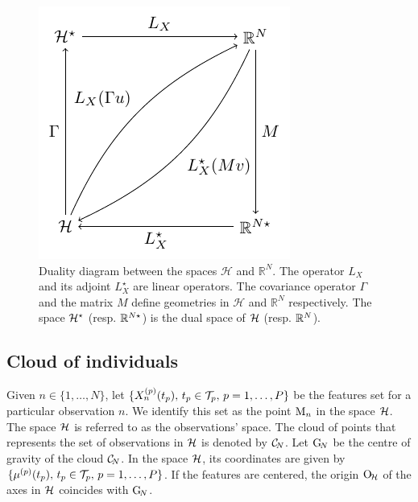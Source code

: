 \begin{figure}
    \centering
    \includegraphics[scale=1.2]{figures/duality_diagram.pdf}
    \caption{Duality diagram between the spaces $\mathcal{H}$ and $\mathbb{R}^N$. The operator $L_X$ and its adjoint $L^\star_X$ are linear operators. The covariance operator $\Gamma$ and the matrix $M$ define geometries in $\mathcal{H}$ and $\mathbb{R}^N$ respectively. The space $\mathcal{H}^\star$ (resp. $\mathbb{R}^{N \star}$) is the dual space of $\mathcal{H}$ (resp. $\mathbb{R}^N$).}
    \label{fig:duality_diagram}
\end{figure}



\subsection{Cloud of individuals} %
\label{sub:cloud_of_individuals}

Given $n \in \{1, \dots, N\}$, let $\{X_n^{(p)}(t_p),\,t_p \in \mathcal{T}_{p},\,p = 1, \dots, P\}$ be the features set for a particular observation $n$. We identify this set as the point $\mathrm{M}_n$ in the space $\mathcal{H}$. The space $\mathcal{H}$ is referred to as the observations' space. The cloud of points that represents the set of observations in $\mathcal{H}$ is denoted by $\mathcal{C}_{\!N}$. Let $\mathrm{G}_{\!N}$ be the centre of gravity of the cloud $\mathcal{C}_{\!N}$. In the space $\mathcal{H}$, its coordinates are given by $\{\mu^{(p)}(t_p),\,t_p \in \mathcal{T}_{p},\,p = 1, \dots, P\}$. If the features are centered, the origin $\mathrm{O}_{\!\mathcal{H}}$ of the axes in $\mathcal{H}$ coincides with $\mathrm{G}_{\!N}$.

